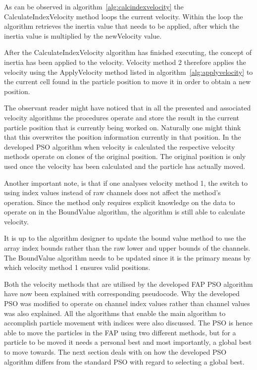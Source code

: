 As can be observed in algorithm~\ref{alg:calcindexvelocity} the CalculateIndexVelocity method loops the current velocity. Within the loop the algorithm retrieves the inertia value that needs to be applied, after which the inertia value is multiplied by the newVelocity value.

After the CalculateIndexVelocity algorithm has finished executing, the concept of inertia has been applied to the velocity. Velocity method 2 therefore applies the velocity using the ApplyVelocity method listed in algorithm~\ref{alg:applyvelocity} to the current cell found in the particle position to move it in order to obtain a new position.

The observant reader might have noticed that in all the presented and associated velocity algorithms the procedures operate and store the result in the current particle position that is currently being worked on. Naturally one might think that this overwrites the position information currently in that position. In the developed PSO algorithm when velocity is calculated the respective velocity methods operate on clones of the original position. The original position is only used once the velocity has been calculated and the particle has actually moved.

Another important note, is that if one analyses velocity method 1, the switch to using index values instead of raw channels does not affect the method's operation. Since the method only requires explicit knowledge on the data to operate on in the BoundValue algorithm, the algorithm is still able to calculate velocity. 

It is up to the algorithm designer to update the bound value method to use the array index bounds rather than the raw lower and upper bounds of the channels. The BoundValue algorithm needs to be updated since it is the primary means by which velocity method 1 ensures valid positions.

Both the velocity methods that are utilised by the developed FAP PSO algorithm have now been explained with corresponding pseudocode. Why the developed PSO was modified to operate on channel index values rather than channel values was also explained. All the algorithms that enable the main algorithm to accomplish particle movement with indices were also discussed. The PSO is hence able to move the particles in the FAP using two different methods, but for a particle to be moved it needs a personal best and most importantly, a global best to move towards. The next section deals with on how the developed PSO algorithm differs from the standard PSO with regard to selecting a global best.
